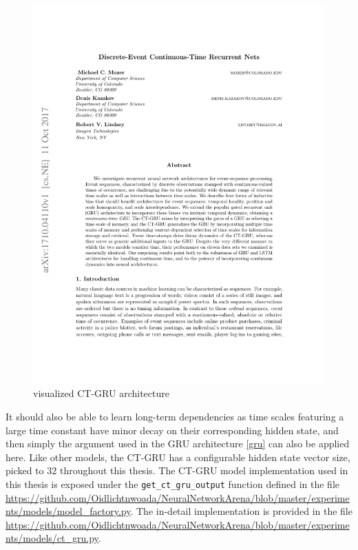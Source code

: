 \documentclass[draft,final]{vutinfth} %
\begin{document}
\begin{figure}[H]
\centering{}
\includegraphics[page=4,width=0.8\linewidth,trim={300 605 150 85},clip]{literature/discrete_event_continuous_time_recurrent_nets.pdf}
\caption{visualized CT-GRU architecture \cite[p. 4]{CTGRU}}
\label{fig:ct_gru_vis}
\end{figure}
It should also be able to learn long-term dependencies as time scales featuring a large time constant have minor decay on their corresponding hidden state, and then simply the argument used in the GRU architecture \ref{gru} can also be applied here.
Like other models, the CT-GRU has a configurable hidden state vector size, picked to $32$ throughout this thesis.
The CT-GRU model implementation used in this thesis is exposed under the \texttt{get\_ct\_gru\_output} function defined in the file \url{https://github.com/Oidlichtnwoada/NeuralNetworkArena/blob/master/experiments/models/model_factory.py}.
The in-detail implementation is provided in the file \url{https://github.com/Oidlichtnwoada/NeuralNetworkArena/blob/master/experiments/models/ct_gru.py}.
\end{document}
